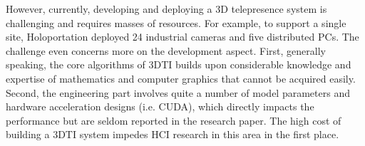 


However, currently, developing and deploying a 3D telepresence system is challenging and requires masses of resources. For example, to support a single site, Holoportation \cite{orts2016holoportation} deployed 24 industrial cameras and five distributed PCs. The challenge even concerns more on the development aspect. First, generally speaking, the core algorithms of 3DTI builds upon considerable knowledge and expertise of mathematics and computer graphics that cannot be acquired easily. Second, the engineering part involves quite a number of model parameters and hardware acceleration designs (i.e. CUDA), which directly impacts the performance but are seldom reported in the research paper. The high cost of building a 3DTI system impedes HCI research in this area in the first place. 




